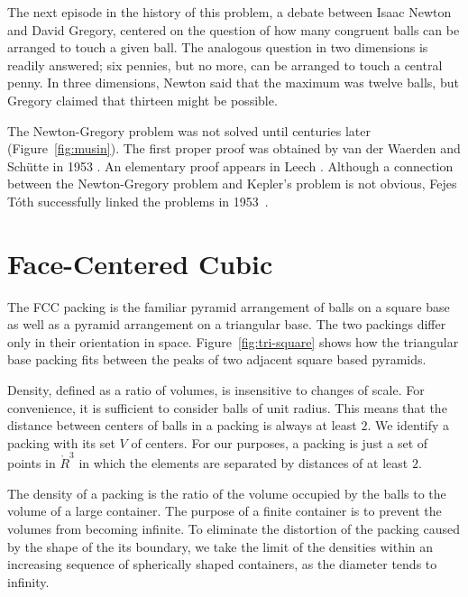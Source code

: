 The next episode in the history of this problem,  a debate between
Isaac Newton and David Gregory,  centered on the
question of how many congruent balls  can be arranged to touch
a given ball.  The analogous question in two dimensions is readily answered;
six pennies, but no more, can be arranged
to touch a central penny.  In three dimensions, Newton said that the maximum was
twelve balls, but Gregory claimed that thirteen might be possible.

The Newton-Gregory problem was not solved until centuries later
(Figure~\ref{fig:musin}).  The first proper proof was obtained by van
der Waerden and Sch\"utte in 1953 \cite{Sch53}.  An elementary proof
appears in Leech \cite{Leech:1956:MG}.  Although a connection between
the Newton-Gregory problem and Kepler's problem is not obvious, Fejes
T\'oth successfully linked the problems in 1953~\cite{Fej53}.

\figPTFTWZM %

\section{Face-Centered Cubic}



The FCC packing is the familiar pyramid arrangement of
balls on a square base as well as a pyramid arrangement on a
triangular base.  The two packings
differ only in their orientation in space.
Figure~\ref{fig:tri-square} shows how the triangular base
packing fits between the peaks of two adjacent square based pyramids.

\figNTNKMGO %

Density, defined as a ratio of volumes, is insensitive to changes of
scale.  For convenience, it is sufficient to consider balls of unit
radius. This means that the distance between centers of balls in a
packing is always  at least $2$.  We identify a packing with its set $V$
of centers.   For our purposes, a packing is just a set of points
in $\ring{R}^3$ in which the elements are separated by distances of at least
$2$.



The density of a packing is the ratio of the volume occupied by the
balls to the volume of a large container.  The
purpose of a finite container is to prevent the volumes from becoming
infinite.  To eliminate the distortion of the packing caused by the
shape of the its boundary, we take the limit of the densities within an increasing
sequence of spherically shaped containers, as the diameter tends to infinity.

